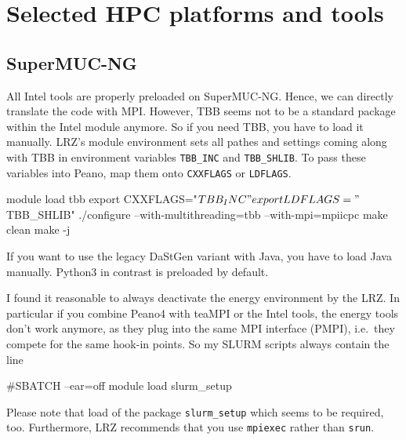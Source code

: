 \chapter{Selected HPC platforms and tools}


\section{SuperMUC-NG}

% 

All Intel tools are properly preloaded on SuperMUC-NG.
Hence, we can directly translate the code with MPI. 
However, TBB seems not to be a standard package within the Intel module anymore. 
So if you need TBB, you have to load it manually.
LRZ's module environment sets all pathes and settings coming along with TBB in
environment variables \texttt{TBB\_INC} and \texttt{TBB\_SHLIB}.
To pass these variables into Peano, map them onto \texttt{CXXFLAGS} or
\texttt{LDFLAGS}.

\begin{code}
 module load tbb
 export CXXFLAGS="$TBB_INC"
 export LDFLAGS="$TBB_SHLIB"
 ./configure --with-multithreading=tbb --with-mpi=mpiicpc
 make clean
 make -j
\end{code}


\noindent
If you want to use the legacy DaStGen variant with Java, you have to load
Java manually.
Python3 in contrast is preloaded by default.


\begin{remark}
 I found it reasonable to always deactivate the energy environment by the LRZ.
 In particular if you combine Peano4 with teaMPI or the Intel tools, the energy
 tools don't work anymore, as they plug into the same MPI interface (PMPI),
 i.e.~they compete for the same hook-in points. So my SLURM scripts always
 contain the line
 \begin{code}
#SBATCH --ear=off
module load slurm_setup
 \end{code}
 Please note that load of the package \texttt{slurm\_setup} which seems to be
 required, too.
 Furthermore, LRZ recommends that you use \texttt{mpiexec} rather than
 \texttt{srun}.
\end{remark}




